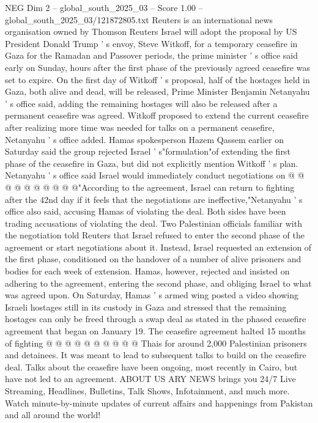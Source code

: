 \begin{textsample}{NEG Dim 2 – global\_south\_2025\_03 – Score 1.00 – global\_south\_2025\_03/121872805.txt}  \label{ex:f2_neg_142}
Reuters is an international news organisation owned by Thomson Reuters Israel will adopt the proposal by US President Donald Trump ' s envoy, Steve Witkoff, for a temporary ceasefire in Gaza for the Ramadan and Passover periods, the prime minister ' s office said early on Sunday, hours after the first phase of the previously agreed ceasefire was set to expire.
On the first day of Witkoff ' s proposal, half of the hostages held in Gaza, both alive and dead, will be released, Prime Minister Benjamin Netanyahu ' s office said, adding the remaining hostages will also be released after a permanent ceasefire was agreed.
Witkoff proposed to extend the current ceasefire after realizing more time was needed for talks on a permanent ceasefire, Netanyahu ' s office added.
Hamas spokesperson Hazem Qassem earlier on Saturday said the group rejected Israel ' s"formulation"of extending the first phase of the ceasefire in Gaza, but did not explicitly mention Witkoff ' s plan.
Netanyahu ' s office said Israel would immediately conduct negotiations on @ @ @ @ @ @ @ @ @ @"According to the agreement, Israel can return to fighting after the 42nd day if it feels that the negotiations are ineffective,"Netanyahu ' s office also said, accusing Hamas of violating the deal.
Both sides have been trading accusations of violating the deal.
Two Palestinian officials familiar with the negotiation told Reuters that Israel refused to enter the second phase of the agreement or start negotiations about it.
Instead, Israel requested an extension of the first phase, conditioned on the handover of a number of alive prisoners and bodies for each week of extension.
Hamas, however, rejected and insisted on adhering to the agreement, entering the second phase, and obliging Israel to what was agreed upon.
On Saturday, Hamas ' s armed wing posted a video showing Israeli hostages still in its custody in Gaza and stressed that the remaining hostages can only be freed through a swap deal as stated in the phased ceasefire agreement that began on January 19.
The ceasefire agreement halted 15 months of fighting @ @ @ @ @ @ @ @ @ @ Thais for around 2,000 Palestinian prisoners and detainees.
It was meant to lead to subsequent talks to build on the ceasefire deal.
Talks about the ceasefire have been ongoing, most recently in Cairo, but have not led to an agreement.
ABOUT US ARY NEWS brings you 24/7 Live Streaming, Headlines, Bulletins, Talk Shows, Infotainment, and much more.
Watch minute-by-minute updates of current affairs and happenings from Pakistan and all around the world!

\end{textsample}
